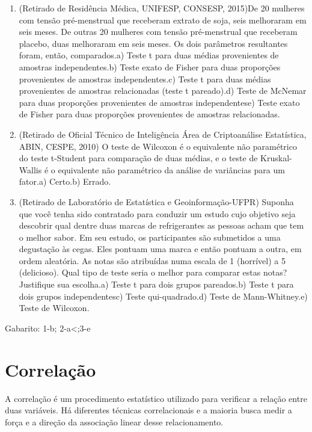 \documentclass[
]{book}
\newenvironment{question}{
  \definecolor{shadecolor}{rgb}{0, 0, 0}  %
  \color{white}
  \begin{shaded}}
 {\end{shaded}}
\begin{document}
\begin{question}

\begin{enumerate}
\def\labelenumi{\arabic{enumi}.}
\item
  (Retirado de Residência Médica, UNIFESP, CONSESP, 2015)De 20 mulheres com tensão pré-menstrual que receberam extrato de soja, seis melhoraram em seis meses. De outras 20 mulheres com tensão pré-menstrual que receberam placebo, duas melhoraram em seis meses. Os dois parâmetros resultantes foram, então, comparados.a) Teste t para duas médias provenientes de amostras independentes.b) Teste exato de Fisher para duas proporções provenientes de amostras independentes.c) Teste t para duas médias provenientes de amostras relacionadas (teste t pareado).d) Teste de McNemar para duas proporções provenientes de amostras independentese) Teste exato de Fisher para duas proporções provenientes de amostras relacionadas.
\item
  (Retirado de Oficial Técnico de Inteligência Área de Criptoanálise Estatística, ABIN, CESPE, 2010) O teste de Wilcoxon é o equivalente não paramétrico do teste t-Student para comparação de duas médias, e o teste de Kruskal-Wallis é o equivalente não paramétrico da análise de variâncias para um fator.a) Certo.b) Errado.
\item
  (Retirado de Laboratório de Estatística e Geoinformação-UFPR) Suponha que você tenha sido contratado para conduzir um estudo cujo objetivo seja descobrir qual dentre duas marcas de refrigerantes as pessoas acham que tem o melhor sabor. Em seu estudo, os participantes são submetidos a uma degustação às cegas. Eles pontuam uma marca e então pontuam a outra, em ordem aleatória. As notas são atribuídas numa escala de 1 (horrível) a 5 (delicioso). Qual tipo de teste seria o melhor para comparar estas notas? Justifique sua escolha.a) Teste t para dois grupos pareados.b) Teste t para dois grupos independentesc) Teste qui-quadrado.d) Teste de Mann-Whitney.e) Teste de Wilcoxon.
\end{enumerate}

\end{question}

Gabarito: 1-b; 2-a\textless;3-e

\hypertarget{correlauxe7uxe3o}{%
\chapter{Correlação}\label{correlauxe7uxe3o}}

A correlação é um procedimento estatístico utilizado para verificar a relação entre duas variáveis. Há diferentes técnicas correlacionais e a maioria busca medir a força e a direção da associação linear desse relacionamento.
\end{document}
